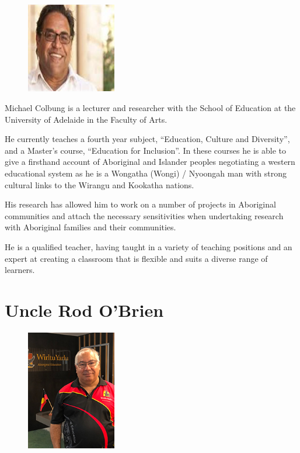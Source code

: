 \documentclass[twoside,12pt,a4paper,notitlepage]{memoir}
\begin{document}
\begin{figure}
\centering
\includegraphics[width=0.35\textwidth]{michael_colbung.jpeg}
\end{figure}

Michael Colbung is a lecturer and researcher with the School of Education at the University of Adelaide in the Faculty of Arts. 

He currently teaches a fourth year subject, “Education, Culture and Diversity”, and a Master’s course, “Education for Inclusion”. In these courses he is able to give a firsthand account of Aboriginal and Islander peoples negotiating a western educational system as he is a Wongatha (Wongi) / Nyoongah man with strong cultural links to the Wirangu and Kookatha nations.

His research has allowed him to work on a number of projects in Aboriginal communities and attach the necessary sensitivities when undertaking research with Aboriginal families and their communities.

He is a qualified teacher, having taught in a variety of teaching positions and an expert at creating a classroom that is flexible and suits a diverse range of learners.
\vfill


\clearpage{}
\vspace*{2cm}
\section*{Uncle Rod O'Brien}

\begin{figure}
\centering
\includegraphics[width=0.35\textwidth]{Rod.jpg}
\end{figure}
\end{document}
